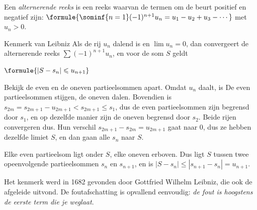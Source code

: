 \begin{theorie}
Een \emph{alternerende reeks} is een reeks waarvan de termen om de beurt positief en negatief zijn: \quad $\formule{\sominf{n=1} (-1)^{n+1} u_n = u_1 - u_2 + u_3 - \cdots}$ \quad met $u_n > 0$.

\begin{stelling}{Kenmerk van Leibniz}
Als de rij $u_n$ dalend is en $\lim u_n = 0$, dan convergeert de alternerende reeks $\sum (-1)^{n+1} u_n$, en voor de som $S$ geldt

\vspace{1mm}
\qquad $\formule{|S - s_n| \leqslant u_{n+1}}$
\end{stelling}

\begin{bewijs}
Bekijk de even en de oneven partieelsommen apart. Omdat $u_n$ daalt, is
De even partieelsommen stijgen, de oneven dalen. Bovendien is $s_{2m} = s_{2m+1} - u_{2m+1} < s_{2m+1} \leqslant s_1$, dus de even partieelsommen zijn begrensd door $s_1$, en op dezelfde manier zijn de oneven begrensd door $s_2$. Beide rijen convergeren dus. Hun verschil $s_{2m+1} - s_{2m} = u_{2m+1}$ gaat naar 0, dus ze hebben dezelfde limiet $S$, en dan gaan alle $s_n$ naar $S$.

Elke even partieelsom ligt onder $S$, elke oneven erboven. Dus ligt $S$ tussen twee opeenvolgende partieelsommen $s_n$ en $s_{n+1}$, en is $|S - s_n| \leqslant |s_{n+1} - s_n| = u_{n+1}$.
\end{bewijs}
\end{theorie}

Het kenmerk werd in 1682 gevonden door Gottfried Wilhelm Leibniz, die ook de afgeleide uitvond. De foutafschatting is opvallend eenvoudig: \textit{de fout is hoogstens de eerste term die je weglaat}.


